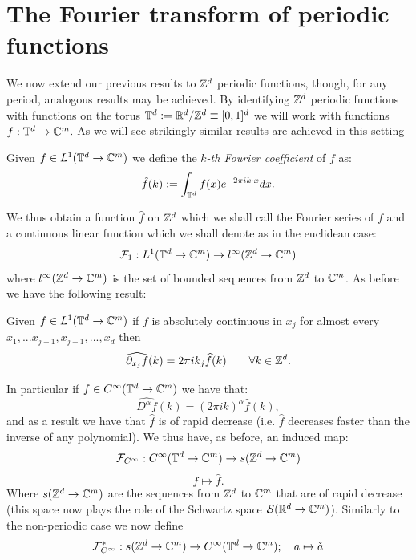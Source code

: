 \documentclass[
    a4paper,
    DIV=14,
    abstract=true,
    numbers=noenddot
]{scrartcl}
\begin{document}
\section{The Fourier transform of periodic functions}
We now extend our previous results to $\mathbb{Z}^d$ periodic functions, though, for any period, analogous results may be achieved. By identifying $\mathbb{Z}^d$ periodic functions with functions on the torus $\mathbb{T}^d:=\mathbb{R}^d/\mathbb{Z}^d\equiv [0,1]^d$ we will work with functions $f:\mathbb{T}^d\to\mathbb{C}^m.$ As we will see strikingly similar results are achieved in this setting
\begin{definition}
	Given $f\in L^1(\mathbb{T}^d\to\mathbb{C}^m)$ we define the \emph{$k$-th Fourier coefficient} of $f$ as:
	\[\hat{f}(k):=\int_{\mathbb{T}^d}f(x)e^{-2\pi ik\cdot x}dx.\]
\end{definition}
\noindent We thus obtain a function $\hat{f}$ on $\mathbb{Z}^d$  which we shall call the Fourier series of $f$ and a continuous linear function which we shall denote as in the euclidean case:
\[\mathcal{F}_1:L^1(\mathbb{T}^d\to\mathbb{C}^m)\to l^\infty(\mathbb{Z}^d\to\mathbb{C}^m)\]
where $l^{\infty}(\mathbb{Z}^d\to\mathbb{C}^m)$ is the set of bounded sequences from $\mathbb{Z}^d$ to $\mathbb{C}^m$. As before we have the following result:
\begin{proposition}\label{regdecaypft}
	Given $f\in L^1(\mathbb{T}^d\to\mathbb{C}^m)$ if $f$ is absolutely continuous in $x_j$ for almost every $x_1,...x_{j-1},x_{j+1},...,x_d$ then
	\[\widehat{\partial_{x_j}{f}}(k)=2\pi i k_j\widehat{f}(k)\qquad\forall k\in\mathbb{Z}^d.\]
\end{proposition}
In particular if $f\in C^\infty(\mathbb{T}^d\to\mathbb{C}^m)$ we have that:
\begin{equation}\label{rgivesdpft}
	\widehat{D^\alpha f}(k)=(2\pi ik)^\alpha\hat{f}(k),
\end{equation}
and as a result we have that $\hat{f}$ is of rapid decrease (i.e. $\hat{f}$ decreases faster than the inverse of any polynomial). We thus have, as before, an induced map:
\[\mathcal{F}_{C^\infty}:C^\infty(\mathbb{T}^d\to\mathbb{C}^m)\to s(\mathbb{Z}^d\to\mathbb{C}^m)\]
\[f\mapsto \hat{f}.\]
Where $s(\mathbb{Z}^d\to\mathbb{C}^m)$ are the sequences from $\mathbb{Z}^d$ to $\mathbb{C}^m$ that are of rapid decrease (this space now plays the role of the Schwartz space $\mathcal{S}(\mathbb{R}^d\to\mathbb{C}^m)$).
\bigbreak
Similarly to the non-periodic case we now define
\[\mathcal{F}^*_{C^\infty}:s(\mathbb{Z}^d\to\mathbb{C}^m)\to C^\infty(\mathbb{T}^d\to\mathbb{C}^m);\quad a\mapsto\check{a}\]
\end{document}
